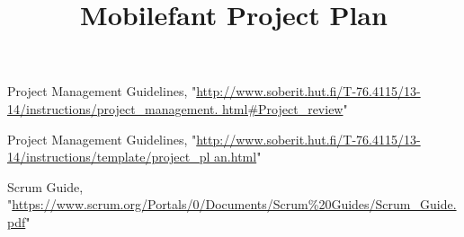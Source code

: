 \documentclass{article}
\begin{document}
\title{Mobilefant Project Plan}

\maketitle


 
\begin{thebibliography}{9}

	Project Management Guidelines, 
"\url{http://www.soberit.hut.fi/T-76.4115/13-14/instructions/project_management.
html#Project_review}"
	
		Project Management Guidelines, 
"\url{http://www.soberit.hut.fi/T-76.4115/13-14/instructions/template/project_pl
an.html}"

Scrum Guide, 
"\url{https://www.scrum.org/Portals/0/Documents/Scrum%20Guides/Scrum_Guide.pdf}"

\end{thebibliography}
\end{document}
